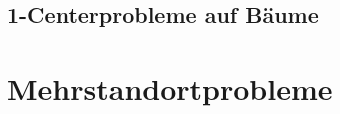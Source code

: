         \subsection{1-Centerprobleme auf Bäume} %
        \label{sub:1_centerprobleme_auf_b_ume}
        


      \section{Mehrstandortprobleme} %
      \label{sec:mehrstandortprobleme}
      




    
